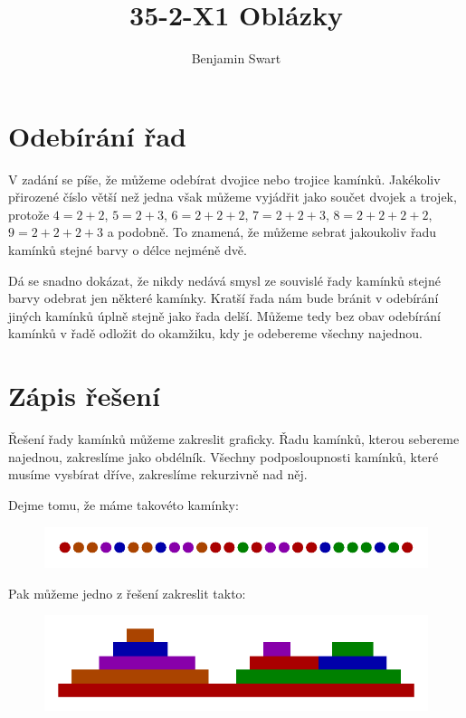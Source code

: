 \documentclass{article}
\title{35-2-X1 Oblázky}
\author{Benjamin Swart}
\begin{document}
\maketitle

\section{Odebírání řad}
\label{section:removal}

V zadání se píše, že můžeme odebírat dvojice nebo trojice kamínků. Jakékoliv přirozené číslo větší než jedna však můžeme vyjádřit jako součet dvojek a trojek, protože $4 = 2 + 2$, $5 = 2 + 3$, $6 = 2 + 2 + 2$, $7 = 2 + 2 + 3$, $8 = 2 + 2 + 2 + 2$, $9 = 2 + 2 + 2 + 3$ a podobně. To znamená, že můžeme sebrat jakoukoliv řadu kamínků stejné barvy o délce nejméně dvě.

Dá se snadno dokázat, že nikdy nedává smysl ze souvislé řady kamínků stejné barvy odebrat jen některé kamínky. Kratší řada nám bude bránit v odebírání jiných kamínků úplně stejně jako řada delší. Můžeme tedy bez obav odebírání kamínků v řadě odložit do okamžiku, kdy je odebereme všechny najednou.

\section{Zápis řešení}
\label{section:diagram}

Řešení řady kamínků můžeme zakreslit graficky. Řadu kamínků, kterou sebereme najednou, zakreslíme jako obdélník. Všechny podposloupnosti kamínků, které musíme vysbírat dříve, zakreslíme rekurzivně nad něj.

Dejme tomu, že máme takovéto kamínky:

\begin{figure}[H]
    \centering
    \includegraphics[scale=1]{marbles.pdf}
\end{figure}

Pak můžeme jedno z řešení zakreslit takto:

\begin{figure}[H]
    \centering
    \includegraphics[scale=1]{solution.pdf}
\end{figure}
\end{document}
